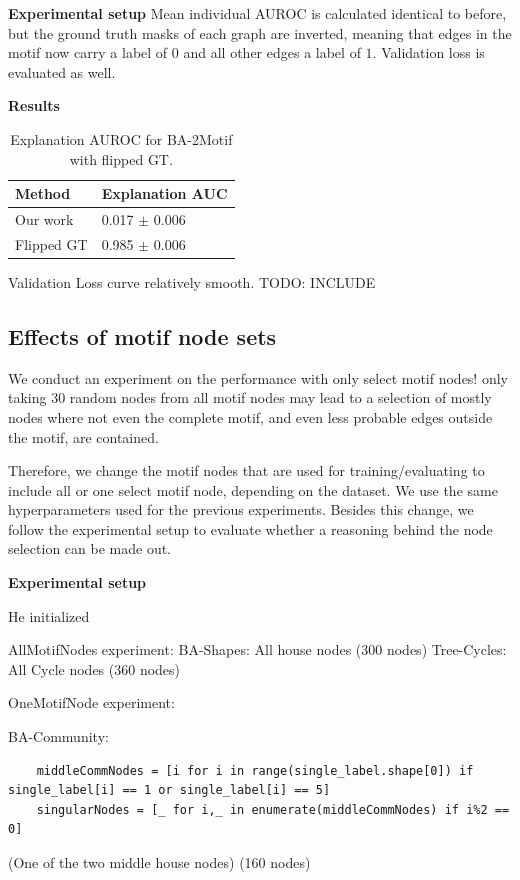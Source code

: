 \textbf{Experimental setup}
Mean individual AUROC is calculated identical to before, but the ground truth masks of each graph are inverted, meaning that edges in the motif now carry a label of $0$ and all other edges a label of $1$. Validation loss is evaluated as well.

\textbf{Results}

\begin{table}[ht]
    \centering
    \scriptsize
    \begin{tabularx}{0.4\textwidth}{l X}
        \toprule
        \textbf{Method} & \textbf{Explanation AUC} \\
        \midrule
        Our work       & 0.017 $\pm$ 0.006 \\
        Flipped GT     & 0.985 $\pm$ 0.006 \\
        \bottomrule
    \end{tabularx}
    \caption[Inductive performance on BA-2Motif with flipped ground truth]{Explanation AUROC for BA-2Motif with flipped GT.}
    \label{tab:allmotifnodes_selected}
\end{table}

Validation Loss curve relatively smooth. TODO: INCLUDE

\subsection{Effects of motif node sets}
\label{sec:motif_set_experiment}

We conduct an experiment on the performance with only select motif nodes! only taking 30 random nodes from all motif nodes may lead to a selection of mostly nodes where not even the complete motif, and even less probable edges outside the motif, are contained.

Therefore, we change the motif nodes that are used for training/evaluating to include all or one select motif node, depending on the dataset. We use the same hyperparameters used for the previous experiments. Besides this change, we follow the experimental setup to evaluate whether a reasoning behind the node selection can be made out.

\textbf{Experimental setup}

He initialized

AllMotifNodes experiment:
BA-Shapes: All house nodes (300 nodes)
Tree-Cycles: All Cycle nodes (360 nodes)
\bigskip


OneMotifNode experiment:

BA-Community:
\begin{verbatim}
    middleCommNodes = [i for i in range(single_label.shape[0]) if single_label[i] == 1 or single_label[i] == 5]
    singularNodes = [_ for i,_ in enumerate(middleCommNodes) if i%2 == 0]
\end{verbatim}
(One of the two middle house nodes) (160 nodes)

